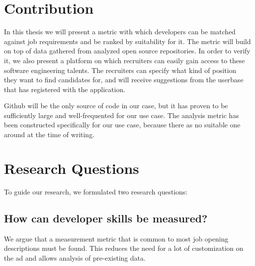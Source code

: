 \section{Contribution}
In this thesis we will present a metric with which developers can be matched
against job requirements and be ranked by suitability for it.
The metric will build on top of data gathered from analyzed open source repositories.
In order to verify it, we also present a platform on which recruiters can easily
gain access to these software engineering talents. The recruiters can specify
what kind of position they want to find candidates for, and will receive
suggestions from the userbase that has registered with the application.

Github will be the only source of code in our case, but it has proven
to be sufficiently large and well-frequented for our use case.
The analysis metric has been constructed specifically for our use case,
because there as no suitable one around at the time of writing.

\section{Research Questions} \label{sec:research-questions}
To guide our research, we formulated two research questions:

\subsection{How can developer skills be measured?}\label{subsec:dev-skill-measurement}
We argue that a measurement metric that is common to most job opening
descriptions must be found. This reduces the need for a lot of customization
on the ad and allows analysis of pre-existing data.
\newline

